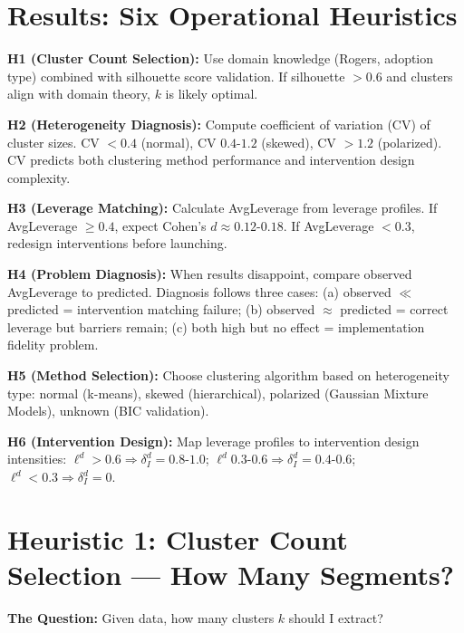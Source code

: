 \section{Results: Six Operational Heuristics}
\label{sec:h-results}

\textbf{H1 (Cluster Count Selection):} Use domain knowledge (Rogers, adoption type) combined with silhouette score validation. If silhouette $> 0.6$ and clusters align with domain theory, $k$ is likely optimal.

\textbf{H2 (Heterogeneity Diagnosis):} Compute coefficient of variation (CV) of cluster sizes. CV $< 0.4$ (normal), CV $0.4$-$1.2$ (skewed), CV $> 1.2$ (polarized). CV predicts both clustering method performance and intervention design complexity.

\textbf{H3 (Leverage Matching):} Calculate AvgLeverage from leverage profiles. If AvgLeverage $\geq 0.4$, expect Cohen's $d \approx 0.12$-$0.18$. If AvgLeverage $< 0.3$, redesign interventions before launching.

\textbf{H4 (Problem Diagnosis):} When results disappoint, compare observed AvgLeverage to predicted. Diagnosis follows three cases: (a) observed $\ll$ predicted = intervention matching failure; (b) observed $\approx$ predicted = correct leverage but barriers remain; (c) both high but no effect = implementation fidelity problem.

\textbf{H5 (Method Selection):} Choose clustering algorithm based on heterogeneity type: normal (k-means), skewed (hierarchical), polarized (Gaussian Mixture Models), unknown (BIC validation).

\textbf{H6 (Intervention Design):} Map leverage profiles to intervention design intensities: $\ell^d > 0.6 \Rightarrow \delta_I^d = 0.8$-$1.0$; $\ell^d 0.3$-$0.6 \Rightarrow \delta_I^d = 0.4$-$0.6$; $\ell^d < 0.3 \Rightarrow \delta_I^d = 0$.

\vspace{1em}


\section{Heuristic 1: Cluster Count Selection --- How Many Segments?}
\label{sec:h1-cluster-count}

\textbf{The Question:} Given data, how many clusters $k$ should I extract?

